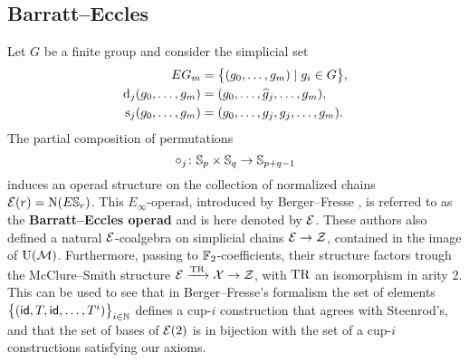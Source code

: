 \subsection{Barratt--Eccles}

Let $G$ be a finite group and consider the simplicial set
\[
\begin{split}
EG_m &= \big\{ (g_0, \dots, g_m) \mid g_i \in G \big\}, \\
\operatorname{d}_j(g_0, \dots, g_m) &= (g_0, \dots, \widehat g_j, \dots, g_m), \\
\operatorname{s}_j(g_0, \dots, g_m) &= (g_0, \dots, g_j, g_j, \dots, g_m).
\end{split}
\]
The partial composition of permutations
\[
\circ_j \colon \mathbb{S}_p \times \mathbb{S}_q \to \mathbb{S}_{p+q-1}
\]
induces an operad structure on the collection of normalized chains $\mathcal{E}(r) = \operatorname{N}(E \mathbb{S}_r)$.
This $E_\infty$-operad, introduced by Berger--Fresse \cite{berger2004combinatorial}, is referred to as the \textbf{Barratt--Eccles operad} and is here denoted by $\mathcal{E}$.
These authors also defined a natural $\mathcal{E}$-coalgebra on simplicial chains $\mathcal{E} \to \mathcal{Z}$,
contained in the image of $\operatorname{U}(\mathcal{M})$.
Furthermore, passing to ${\mathbb{F}_2}$-coefficients, their structure factors trough the McClure--Smith structure $\mathcal{E} \xrightarrow{\operatorname{TR}} \mathcal{X} \to \mathcal{Z}$, with $\operatorname{TR}$ an isomorphism in arity 2.
This can be used to see that in Berger--Fresse's formalism the set of elements $\big\{ (\mathsf{id}, T, \mathsf{id}, \dots, T^i) \big\}_{i \in \mathbb{N}}$ defines a \mbox{cup-$i$} construction that agrees with Steenrod's, and that the set of bases of $\mathcal{E}(2)$ is in bijection with the set of a \mbox{cup-$i$} constructions satisfying our axioms.